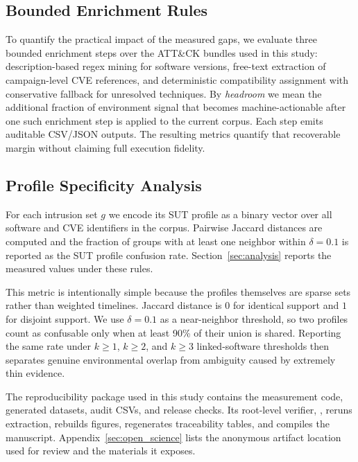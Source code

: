 \documentclass[sigconf]{acmart}
\begin{document}
\subsection{Bounded Enrichment Rules}

To quantify the practical impact of the measured gaps, we evaluate three bounded enrichment steps over the ATT\&CK bundles used in this study: description-based regex mining for software versions, free-text extraction of campaign-level CVE references, and deterministic compatibility assignment with conservative fallback for unresolved techniques. By \emph{headroom} we mean the additional fraction of environment signal that becomes machine-actionable after one such enrichment step is applied to the current corpus. Each step emits auditable CSV/JSON outputs. The resulting metrics quantify that recoverable margin without claiming full execution fidelity.

\subsection{Profile Specificity Analysis}

For each intrusion set $g$ we encode its SUT profile as a binary vector over all software and CVE identifiers in the corpus. Pairwise Jaccard distances are computed and the fraction of groups with at least one neighbor within $\delta = 0.1$ is reported as the SUT profile confusion rate. Section~\ref{sec:analysis} reports the measured values under these rules.

This metric is intentionally simple because the profiles themselves are sparse sets rather than weighted timelines. Jaccard distance is $0$ for identical support and $1$ for disjoint support. We use $\delta = 0.1$ as a near-neighbor threshold, so two profiles count as confusable only when at least 90\% of their union is shared. Reporting the same rate under $k \geq 1$, $k \geq 2$, and $k \geq 3$ linked-software thresholds then separates genuine environmental overlap from ambiguity caused by extremely thin evidence.

The reproducibility package used in this study contains the measurement code, generated datasets, audit CSVs, and release checks. Its root-level verifier, , reruns extraction, rebuilds figures, regenerates traceability tables, and compiles the manuscript. Appendix~\ref{sec:open_science} lists the anonymous artifact location used for review and the materials it exposes.


\end{document}
